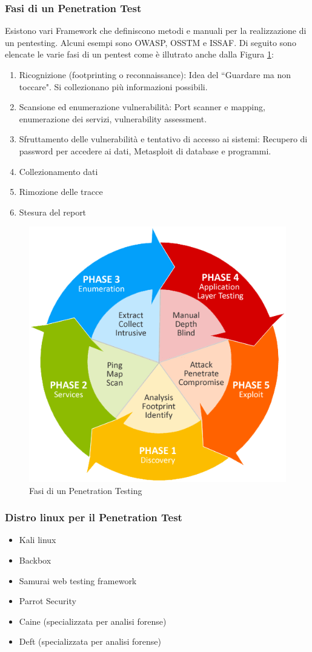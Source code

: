 \subsubsection{Fasi di un Penetration Test}
Esistono vari Framework che definiscono metodi e manuali per la realizzazione di un pentesting. Alcuni esempi sono OWASP, OSSTM e ISSAF. Di seguito sono elencate le varie fasi di un pentest come è illutrato anche dalla Figura \ref{img:pentest_phases}:
\begin{enumerate}
\item Ricognizione (footprinting o reconnaissance): Idea del \textquotedblleft Guardare ma non toccare". Si collezionano più informazioni possibili.
\item Scansione ed enumerazione vulnerabilità: Port scanner e mapping, enumerazione dei servizi, vulnerability assessment.
\item Sfruttamento delle vulnerabilità e tentativo di accesso ai sistemi: Recupero di password per accedere ai dati, Metasploit di database e programmi.
\item Collezionamento dati
\item Rimozione delle tracce
\item Stesura del report
\end{enumerate}
\begin{figure}[htbp]
	\centering
	\includegraphics[scale = 0.4]{images/pentest_phases}
	\caption{Fasi di un Penetration Testing}
	\label{img:pentest_phases}
\end{figure}

\subsubsection{Distro linux per il Penetration Test}
\begin{itemize}
\item Kali linux
\item Backbox
\item Samurai web testing framework
\item Parrot Security
\item Caine (specializzata per analisi forense)
\item Deft (specializzata per analisi forense)
\end{itemize}